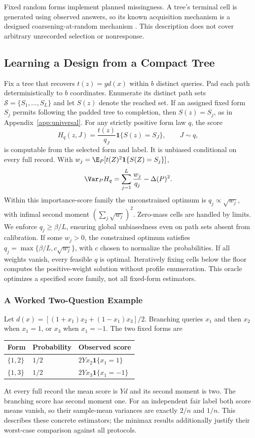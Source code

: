 Fixed random forms implement planned missingness. A tree's terminal cell is generated using observed answers, so its known acquisition mechanism is a designed coarsening-at-random mechanism \citep{heitjan1991,gill1997}. This description does not cover arbitrary unrecorded selection or nonresponse.

\subsection{Learning a Design from a Compact Tree}\label{app:pathdesign}
Fix a tree that recovers $t(z)=yd(x)$ within $b$ distinct queries. Pad each path deterministically to $b$ coordinates. Enumerate its distinct path sets $\mathcal S=\{S_1,\ldots,S_L\}$ and let $S(z)$ denote the reached set. If an assigned fixed form $S_j$ permits following the padded tree to completion, then $S(z)=S_j$, as in Appendix~\ref{app:universal}. For any strictly positive form law $q$, the score
\[
 H_q(z,J)=\frac{t(z)}{q_J}\mathbf1\{S(z)=S_J\},\qquad J\sim q,
\]
is computable from the selected form and label. It is unbiased conditional on every full record. With $w_j=\E_P[t(Z)^2\mathbf1\{S(Z)=S_j\}]$,
\begin{equation}
 \Var_P H_q=\sum_{j=1}^L\frac{w_j}{q_j}-\Delta(P)^2.
 \label{eq:pathvariance}
\end{equation}
Within this importance-score family the unconstrained optimum is $q_j\propto\sqrt{w_j}$, with infimal second moment $(\sum_j\sqrt{w_j})^2$. Zero-mass cells are handled by limits. We enforce $q_j\ge\beta/L$, ensuring global unbiasedness even on path sets absent from calibration. If some $w_j>0$, the constrained optimum satisfies $q_j=\max\{\beta/L,c\sqrt{w_j}\}$, with $c$ chosen to normalize the probabilities. If all weights vanish, every feasible $q$ is optimal. Iteratively fixing cells below the floor computes the positive-weight solution without profile enumeration. This oracle optimizes a specified score family, not all fixed-form estimators.

\subsubsection{A Worked Two-Question Example}
Let $d(x)=[(1+x_1)x_2+(1-x_1)x_3]/2$. Branching queries $x_1$ and then $x_2$ when $x_1=1$, or $x_3$ when $x_1=-1$. The two fixed forms are
\begin{center}
\begin{tabular}{lll}
\toprule
Form & Probability & Observed score\\
\midrule
$\{1,2\}$ & $1/2$ & $2Yx_2\mathbf1\{x_1=1\}$\\
$\{1,3\}$ & $1/2$ & $2Yx_3\mathbf1\{x_1=-1\}$\\
\bottomrule
\end{tabular}
\end{center}
At every full record the mean score is $Yd$ and its second moment is two. The branching score has second moment one. For an independent fair label both score means vanish, so their sample-mean variances are exactly $2/n$ and $1/n$. This describes these concrete estimators; the minimax results additionally justify their worst-case comparison against all protocols.

